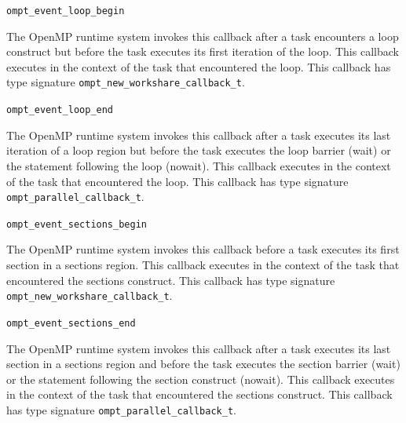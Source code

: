 \documentclass{article}
\newcommand{\descheader}[1]{{\needspace{3\baselineskip}\vspace{1em}\noindent \fbox{#1}}}
\begin{document}
\begin{description}
\sloppy
\item \verb|ompt_event_loop_begin|
 
  The OpenMP runtime system invokes this callback after a task encounters a loop construct
   but before the task
  executes its first  iteration of the loop. This callback executes in the
  context of the task that encountered the loop.
This callback has type signature \verb|ompt_new_workshare_callback_t|. 

\item \verb|ompt_event_loop_end|
 
  The OpenMP runtime system invokes this callback after a task executes its last iteration of a loop region
  but before the task executes
  the loop barrier (wait) or the statement following the loop
  (nowait). This callback executes in the context of the task that encountered the loop.     %
This callback has type signature \verb|ompt_parallel_callback_t|. 
\end{description}

\descheader{Sections}

\begin{description}
\item \verb|ompt_event_sections_begin|
 
  The OpenMP runtime system invokes this callback before a task executes its first section in a sections region.
  This callback executes in the context of
  the task that encountered the sections construct.
  This callback has type signature \verb|ompt_new_workshare_callback_t|. 

\item \verb|ompt_event_sections_end|

 \sloppy
  The OpenMP runtime system invokes this callback after a task executes  its last
  section in a sections region and before the task
  executes the section barrier (wait) or the statement following the
  section construct (nowait). This callback executes in the context
  of the task that encountered the sections construct.
This callback has type signature \verb|ompt_parallel_callback_t|. 

\end{description}

\descheader{Single Blocks}
\end{document}
